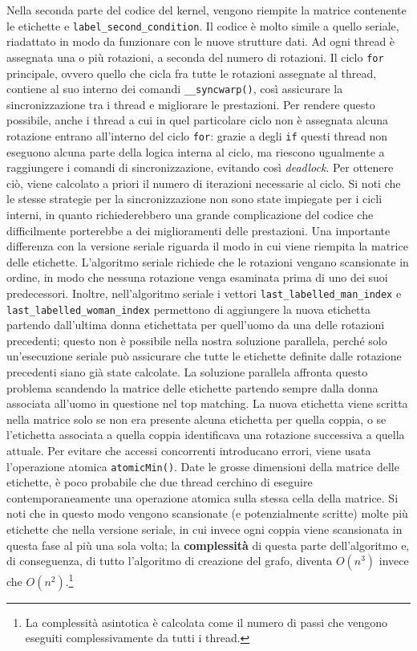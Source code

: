 \documentclass[12pt]{article}
\begin{document}
    Nella seconda parte del codice del kernel, vengono riempite la matrice contenente le etichette e \texttt{label\_second\_condition}. Il codice è molto simile a quello seriale, riadattato in modo da funzionare con le nuove strutture dati. Ad ogni thread è assegnata una o più rotazioni, a seconda del numero di rotazioni. Il ciclo \texttt{for} principale, ovvero quello che cicla fra tutte le rotazioni assegnate al thread, contiene al suo interno dei comandi \texttt{\_\_syncwarp()}, così assicurare la sincronizzazione tra i thread e migliorare le prestazioni. Per rendere questo possibile, anche i thread a cui in quel particolare ciclo non è assegnata alcuna rotazione entrano all'interno del ciclo \texttt{for}: grazie a degli \texttt{if} questi thread non eseguono alcuna parte della logica interna al ciclo, ma riescono ugualmente a raggiungere i comandi di sincronizzazione, evitando così \textit{deadlock}. Per ottenere ciò, viene calcolato a priori il numero di iterazioni necessarie al ciclo. Si noti che le stesse strategie per la sincronizzazione non sono state impiegate per i cicli interni, in quanto richiederebbero una grande complicazione del codice che difficilmente porterebbe a dei miglioramenti delle prestazioni. Una importante differenza con la versione seriale riguarda il modo in cui viene riempita la matrice delle etichette. L'algoritmo seriale richiede che le rotazioni vengano scansionate in ordine, in modo che nessuna rotazione venga esaminata prima di uno dei suoi predecessori. Inoltre, nell'algoritmo seriale i vettori \texttt{last\_labelled\_man\_index} e \texttt{last\_labelled\_woman\_index} permettono di aggiungere la nuova etichetta partendo dall'ultima donna etichettata per quell'uomo da una delle rotazioni precedenti; questo non è possibile nella nostra soluzione parallela, perché solo un'esecuzione seriale può assicurare che tutte le etichette definite dalle rotazione precedenti siano già state calcolate. La soluzione parallela affronta questo problema scandendo la matrice delle etichette partendo sempre dalla donna associata all'uomo in questione nel top matching. La nuova etichetta viene scritta nella matrice solo se non era presente alcuna etichetta per quella coppia, o se l'etichetta associata a quella coppia identificava una rotazione successiva a quella attuale. Per evitare che accessi concorrenti introducano errori, viene usata l'operazione atomica \texttt{atomicMin()}. Date le grosse dimensioni della matrice delle etichette, è poco probabile che due thread cerchino di eseguire contemporaneamente una operazione atomica sulla stessa cella della matrice. Si noti che in questo modo vengono scansionate (e potenzialmente scritte) molte più etichette che nella versione seriale, in cui invece ogni coppia viene scansionata in questa fase al più una sola volta; la \textbf{complessità} di questa parte dell'algoritmo e, di conseguenza, di tutto l'algoritmo di creazione del grafo, diventa $O(n^3)$ invece che $O(n^2)$.\footnote{La complessità asintotica è calcolata come il numero di passi che vengono eseguiti complessivamente da tutti i thread.}
\end{document}
